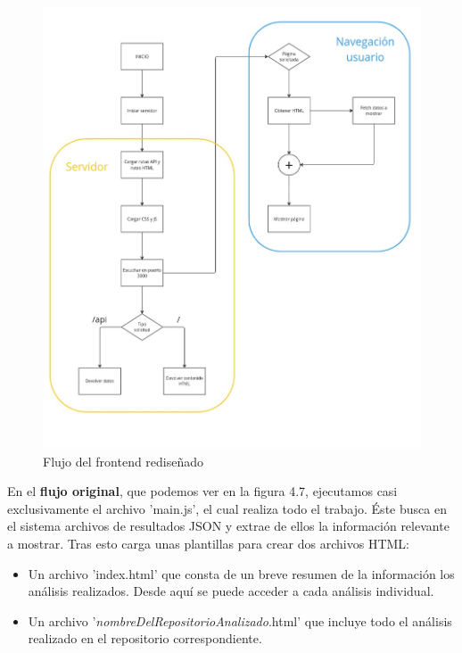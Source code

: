 \documentclass[a4paper, 12pt]{book}
\begin{document}
\begin{figure} [H]
    \centering
    \includegraphics[width=\textwidth, height=\textheight, keepaspectratio]{img/esquema_frontend_final.jpg}
    \caption{Flujo del frontend rediseñado}
    \label{fig:final_frontend}
\end{figure}

En el \textbf{flujo original}, que podemos ver en la figura 4.7, ejecutamos casi exclusivamente el archivo 'main.js', el cual realiza todo el trabajo. Éste busca en el sistema archivos de resultados JSON y extrae de ellos la información relevante a mostrar. Tras esto carga unas plantillas para crear dos archivos HTML:

\begin{itemize}
    \item Un archivo 'index.html' que consta de un breve resumen de la información los análisis realizados. Desde aquí se puede acceder a cada análisis individual.
    \item Un archivo '\textit{nombreDelRepositorioAnalizado}.html' que incluye todo el análisis realizado en el repositorio correspondiente.
\end{itemize}
\end{document}
